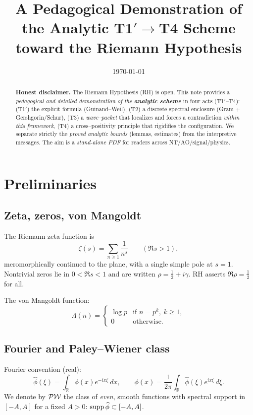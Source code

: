 \documentclass[11pt,a4paper]{proofarticle}
\title{A Pedagogical Demonstration of the Analytic T1$′$$\to$T4 Scheme toward the Riemann Hypothesis}
\author{\InterIAauthors}
\date{\today}
\begin{document}


\maketitle
\begin{abstract}
\textbf{Honest disclaimer.} The Riemann Hypothesis (RH) is open.
This note provides a \emph{pedagogical and detailed demonstration of the \textbf{analytic scheme}} in four acts
(T1$′$–T4): (T1$′$) the explicit formula (Guinand–Weil), (T2) a discrete spectral enclosure (Gram + Gershgorin/Schur),
(T3) a \emph{wave–packet} that localizes and forces a contradiction \emph{within this framework}, (T4) a cross–positivity
principle that rigidifies the configuration. We separate strictly the \emph{proved analytic bounds} (lemmas, estimates)
from the interpretive messages. The aim is a \emph{stand-alone PDF} for readers across NT/AO/signal/physics.
\end{abstract}

\tableofcontents

\section{Preliminaries}
\subsection{Zeta, zeros, von Mangoldt}
The Riemann zeta function is
\[
\zeta(s)=\sum_{n\ge 1} \frac{1}{n^s}\qquad (\Re s>1),
\]
meromorphically continued to the plane, with a single simple pole at $s=1$.
Nontrivial zeros lie in $0<\Re s<1$ and are written $\rho=\tfrac12+i\gamma$.
RH asserts $\Re \rho=\frac12$ for all.

The von Mangoldt function:
\[
\Lambda(n)=
\begin{cases}
\log p &\text{if } n=p^k,\ k\ge 1,\\
0 &\text{otherwise.}
\end{cases}
\]

\subsection{Fourier and Paley–Wiener class}
Fourier convention (real):
\[
\widehat\phi(\xi)=\int_{\mathbb R}\phi(x)e^{-ix\xi}\,dx,\qquad
\phi(x)=\frac{1}{2\pi}\int_{\mathbb R}\widehat\phi(\xi)e^{ix\xi}\,d\xi.
\]
We denote by $\mathcal{PW}$ the class of \emph{even}, smooth functions with spectral support in $[-A,A]$
for a fixed $A>0$: $\operatorname{supp} \widehat\phi\subset[-A,A]$.
\end{document}
